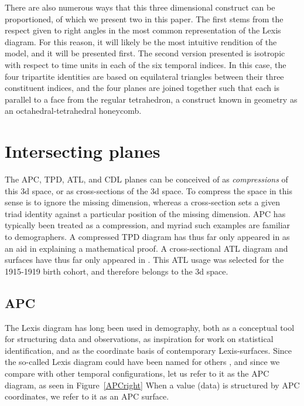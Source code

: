 \documentclass[11pt,oneside]{article} %
\newcommand\eg[1]{\textcolor{bl}{#1}}
\newcommand\tgh[1]{\raisebox{-.25\height}{\texttt{[image: Figures/triadtable/triad\#1.pdf]}}}
\begin{document}
There are also
numerous ways that this three dimensional construct can be proportioned, of
which we present two in this paper. The first stems from the respect given to
right angles in the most common representation of the Lexis diagram. For this reason, it will likely be
the most intuitive rendition of the model, and it will be presented first. The
second version presented is isotropic with respect to time units in each of the
six temporal indices. In this case, the four tripartite identities are based on
equilateral triangles between their three constituent indices, and the four
planes are joined together such that each is parallel to a face from the regular
tetrahedron, a construct known in geometry as an octahedral-tetrahedral
honeycomb.

\section*{Intersecting planes}

The \eg{APC}, \eg{TPD}, \eg{ATL}, and \eg{CDL} planes can be conceived of as
\textit{compressions} of this 3d space, or as cross-sections of the 3d space. To
compress the space in this sense is to ignore the missing dimension,
whereas a cross-section sets a given triad identity against a particular
position of the missing dimension. \eg{APC} has typically been treated as a
compression, and myriad such examples are familiar to demographers.
A compressed \eg{TPD} diagram has thus far only appeared in \citet{pancho2015} as an aid in explaining a mathematical proof.
A cross-sectional \eg{ATL} diagram and surfaces have thus far only appeared in
\citet{riffe2015ttd}. This \eg{ATL} usage was selected for the 1915-1919 birth
cohort, and therefore belongs to the 3d space.

\subsection*{\eg{APC} \tgh{APC}}
The Lexis diagram has long been used in demography, both as a conceptual tool
for structuring data and observations, as inspiration for work on
statistical identification, and as the coordinate basis of contemporary
Lexis-surfaces.
Since the so-called Lexis diagram could have been named for others
\citep{vandeschrick2001lexis,keiding2011age}, and since we compare with other
temporal configurations, let us refer to it as the APC diagram, as seen in
Figure~\ref{APCright}
When a value (data) is structured by APC coordinates, we refer to it as an APC surface.
\end{document}
